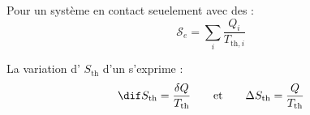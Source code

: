 \begin{propriete}
Pour un système en contact seuelement avec des  :
\[\mathscr{S}_e = \sum_i \frac{Q_i}{T_{\mathrm{th}, i}}\]
\end{propriete}

\begin{propriete}[admis]
La variation d' $S_{\mathrm{th}}$ d'un  s'exprime :
\[\dif S_{\mathrm{th}} = \frac{\delta Q}{T_{\mathrm{th}}} \qquad \text{et} \qquad \Delta S_{\mathrm{th}} = \frac{Q}{T_\mathrm{th}}\]
\end{propriete}